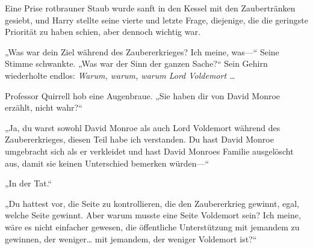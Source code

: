 Eine Prise rotbrauner Staub wurde sanft in den Kessel mit den Zaubertränken gesiebt, und Harry stellte seine vierte und letzte Frage, diejenige, die die geringste Priorität zu haben schien, aber dennoch wichtig war.

„Was war dein Ziel während des Zaubererkrieges? Ich meine, was—“
Seine Stimme schwankte.
„Was war der Sinn der ganzen Sache?“
Sein Gehirn wiederholte endlos: \emph{Warum, warum, warum Lord Voldemort …}

Professor Quirrell hob eine Augenbraue.
„Sie haben dir von David Monroe erzählt, nicht wahr?“

„Ja, du warst sowohl David Monroe als auch Lord Voldemort während des Zaubererkrieges, diesen Teil habe ich verstanden. Du hast David Monroe umgebracht sich als er verkleidet und hast David Monroes Familie ausgelöscht aus, damit sie keinen Unterschied bemerken würden—“

„In der Tat.“

„Du hattest vor, die Seite zu kontrollieren, die den Zaubererkrieg gewinnt, egal, welche Seite gewinnt. Aber warum musste eine Seite Voldemort sein? Ich meine, wäre es nicht einfacher gewesen, die öffentliche Unterstützung mit jemandem zu gewinnen, der weniger… mit jemandem, der weniger Voldemort ist?“


